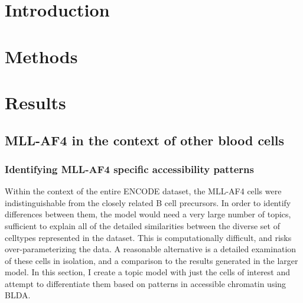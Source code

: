 

\section{Introduction} \label{ch5:intro}

\section{Methods} \label{ch5:methods}

\section{Results} \label{ch5:results}

\subsection{MLL-AF4 in the context of other blood cells}

\subsubsection{Identifying MLL-AF4 specific accessibility patterns}



Within the context of the entire ENCODE dataset, the MLL-AF4 cells were indistinguishable from the closely related B cell precursors. In order to identify differences between them, the model would need a very large number of topics, sufficient to explain all of the detailed similarities between the diverse set of celltypes represented in the dataset. This is computationally difficult, and risks over-parameterizing the data. A reasonable alternative is a detailed examination of these cells in isolation, and a comparison to the results generated in the larger model. In this section, I create a topic model with just the cells of interest and attempt to differentiate them based on patterns in accessible chromatin using BLDA.

